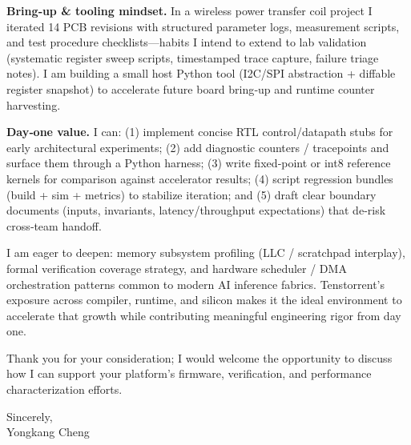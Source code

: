 \documentclass[11pt]{article}
\begin{document}
\textbf{Bring‑up & tooling mindset.} In a wireless power transfer coil project I iterated 14 PCB revisions with structured parameter logs, measurement scripts, and test procedure checklists—habits I intend to extend to lab validation (systematic register sweep scripts, timestamped trace capture, failure triage notes). I am building a small host Python tool (I2C/SPI abstraction + diffable register snapshot) to accelerate future board bring‑up and runtime counter harvesting.

\textbf{Day‑one value.} I can: (1) implement concise RTL control/datapath stubs for early architectural experiments; (2) add diagnostic counters / tracepoints and surface them through a Python harness; (3) write fixed‑point or int8 reference kernels for comparison against accelerator results; (4) script regression bundles (build + sim + metrics) to stabilize iteration; and (5) draft clear boundary documents (inputs, invariants, latency/throughput expectations) that de‑risk cross‑team handoff.

I am eager to deepen: memory subsystem profiling (LLC / scratchpad interplay), formal verification coverage strategy, and hardware scheduler / DMA orchestration patterns common to modern AI inference fabrics. Tenstorrent’s exposure across compiler, runtime, and silicon makes it the ideal environment to accelerate that growth while contributing meaningful engineering rigor from day one.

Thank you for your consideration; I would welcome the opportunity to discuss how I can support your platform’s firmware, verification, and performance characterization efforts.

\vspace{1em}
Sincerely,\\[1.2em]
Yongkang Cheng
\end{document}

